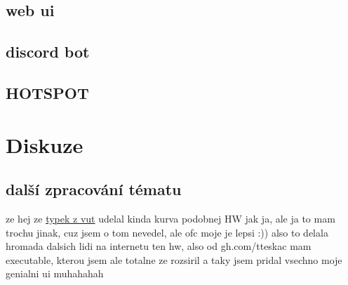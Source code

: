 \documentclass{template/socthesis}
\begin{document}
\section{web ui}
\section{discord bot}
\section{HOTSPOT}

\chapter{Diskuze}
\section{další zpracování tématu}
ze hej ze \href{https://dspace.vutbr.cz/bitstream/handle/11012/38621/final-thesis.pdf?sequence=-1}{typek z vut} udelal kinda kurva podobnej HW jak ja, ale ja to mam trochu jinak, cuz jsem o tom nevedel, ale ofc moje je lepsi :))
also to delala hromada dalsich lidi na internetu ten hw, also od gh.com/tteskac mam executable, kterou jsem ale totalne ze rozsiril a taky jsem pridal vsechno moje genialni ui muhahahah
\end{document}
